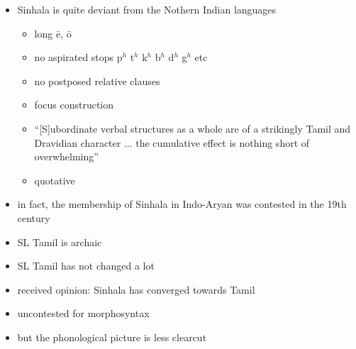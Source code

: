 \documentclass[a4paper,utf8]{article}
\begin{document}
\begin{itemize}
 \item  Sinhala is quite deviant from the Nothern Indian languages
\begin{itemize}
 \item long \=e, \=o
 \item no aspirated stops p$^h$ t$^h$ k$^h$ b$^h$ d$^h$ g$^h$  etc \citep{Elizarenkova1972}
 \item no postposed relative clauses \citep[507]{Geiger1973}\citep[204]{Gair1998someremarks}
 \item focus construction \citep{Gair1985calque}
 \item ``[S]ubordinate verbal structures as a whole are of a strikingly Tamil and Dravidian character ...  the cumulative effect is nothing short of overwhelming'' \citep{Gair1998someremarks}
\item quotative \citep{Gair1998someremarks}
\end{itemize}
 \item in fact, the membership of Sinhala in Indo-Aryan was contested in the 19th century \citep{Tennent1859,Prakasar1936,Prakasar1937,Geiger1938,Geiger1973}%
\end{itemize}

\begin{itemize}
 \item SL Tamil is archaic \citep{Zvelebil1959II}
 \item SL Tamil has not changed a lot
 \item received opinion: Sinhala has converged towards Tamil
 \item uncontested for morphosyntax
 \item but the phonological picture is less clearcut \citep{Gair1985dravidianization}
\end{itemize}
\end{document}

